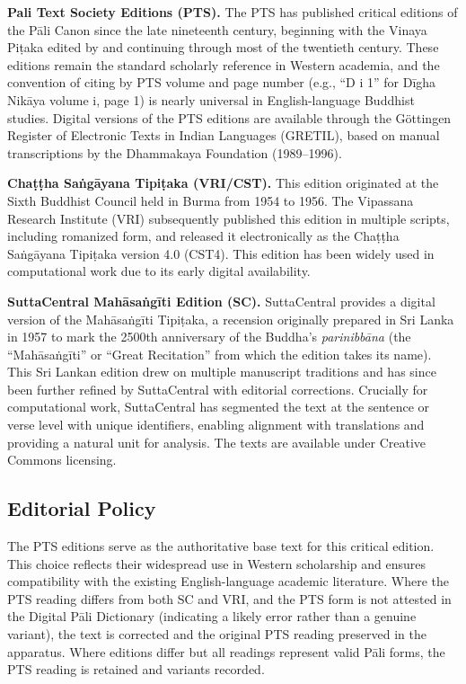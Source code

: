 \documentclass[unnumsec,webpdf,contemporary,large]{oup-authoring-template}
\begin{document}
\textbf{Pali Text Society Editions (PTS).} The PTS has published critical editions of the Pāli Canon since the late nineteenth century, beginning with the Vinaya Piṭaka edited by \citet{oldenberg1879} and continuing through most of the twentieth century. These editions remain the standard scholarly reference in Western academia, and the convention of citing by PTS volume and page number (e.g., ``D i 1'' for Dīgha Nikāya volume i, page 1) is nearly universal in English-language Buddhist studies. Digital versions of the PTS editions are available through the Göttingen Register of Electronic Texts in Indian Languages (GRETIL), based on manual transcriptions by the Dhammakaya Foundation (1989–1996).

\textbf{Chaṭṭha Saṅgāyana Tipiṭaka (VRI/CST).} This edition originated at the Sixth Buddhist Council held in Burma from 1954 to 1956. The Vipassana Research Institute (VRI) subsequently published this edition in multiple scripts, including romanized form, and released it electronically as the Chaṭṭha Saṅgāyana Tipiṭaka version 4.0 (CST4). This edition has been widely used in computational work due to its early digital availability.

\textbf{SuttaCentral Mahāsaṅgīti Edition (SC).} SuttaCentral provides a digital version of the Mahāsaṅgīti Tipiṭaka, a recension originally prepared in Sri Lanka in 1957 to mark the 2500th anniversary of the Buddha's \emph{parinibbāna} (the ``Mahāsaṅgīti'' or ``Great Recitation'' from which the edition takes its name). This Sri Lankan edition drew on multiple manuscript traditions and has since been further refined by SuttaCentral with editorial corrections. Crucially for computational work, SuttaCentral has segmented the text at the sentence or verse level with unique identifiers, enabling alignment with translations and providing a natural unit for analysis. The texts are available under Creative Commons licensing.

\subsection{Editorial Policy}

The PTS editions serve as the authoritative base text for this critical edition. This choice reflects their widespread use in Western scholarship and ensures compatibility with the existing English-language academic literature. Where the PTS reading differs from both SC and VRI, and the PTS form is not attested in the Digital Pāli Dictionary (indicating a likely error rather than a genuine variant), the text is corrected and the original PTS reading preserved in the apparatus. Where editions differ but all readings represent valid Pāli forms, the PTS reading is retained and variants recorded.
\end{document}

